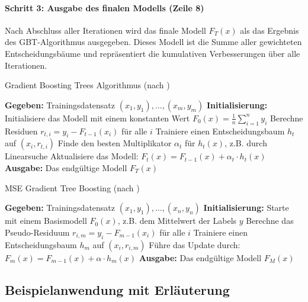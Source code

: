 \paragraph{Schritt 3: Ausgabe des finalen Modells (Zeile 8)}
\label{para:gbt_algo_s3}
Nach Abschluss aller Iterationen wird das finale Modell \( F_T(x) \) als das Ergebnis des GBT-Algorithmus ausgegeben. Dieses Modell ist die Summe aller gewichteten Entscheidungsbäume und repräsentiert die kumulativen Verbesserungen über alle Iterationen.

\begin{algorithm}[H]
    \caption[Gradient Boosting Trees Algorithmus]{Gradient Boosting Trees Algorithmus (nach \textcite[S.~346]{Frochte2020})}\label{algo:gbt}
    \begin{algorithmic}[1]
    \State \textbf{Gegeben:} Trainingsdatensatz \( (x_1,y_1), \dots, (x_m,y_m) \)
    \State \textbf{Initialisierung:} Initialisiere das Modell mit einem konstanten Wert \( F_0(x) = \frac{1}{n} \sum_{i=1}^{n} y_i \)
        \State Berechne Residuen \( r_{t,i} = y_i - F_{t-1}(x_i) \) für alle \( i \)
        \State Trainiere einen Entscheidungsbaum \( h_t \) auf \( (x_i, r_{t,i}) \)
        \State Finde den besten Multiplikator \( \alpha_t \) für \( h_t(x) \), z.B. durch Linearsuche
        \State Aktualisiere das Modell: \( F_t(x) = F_{t-1}(x) + \alpha_t \cdot h_t(x) \)
    \EndFor
    \State \textbf{Ausgabe:} Das endgültige Modell \( F_T(x) \)
    \end{algorithmic}
\end{algorithm}

\begin{algorithm}[H]
    \caption[MSE Gradient Tree Boosting]{MSE Gradient Tree Boosting (nach \textcite[S.~346]{Frochte2020})}\label{algo:gbt}
    \begin{algorithmic}[1]
    \State \textbf{Gegeben:} Trainingsdatensatz \( (x_1,y_1), \dots, (x_n,y_n) \)
    \State \textbf{Initialisierung:} Starte mit einem Basismodell \( F_0(x) \), z.B. dem Mittelwert der Labels \( y \)
        \State Berechne das Pseudo-Residuum \( r_{i,m} = y_i - F_{m-1}(x_i) \) für alle \( i \)
        \State Trainiere einen Entscheidungsbaum \( h_m \) auf \( (x_i, r_{i,m}) \)
        \State Führe das Update durch: \( F_m(x) = F_{m-1}(x) + \alpha \cdot h_m(x) \)
    \EndFor
    \State \textbf{Ausgabe:} Das endgültige Modell \( F_M(x) \)
    \end{algorithmic}
\end{algorithm}





\subsection{Beispielanwendung mit Erläuterung}
